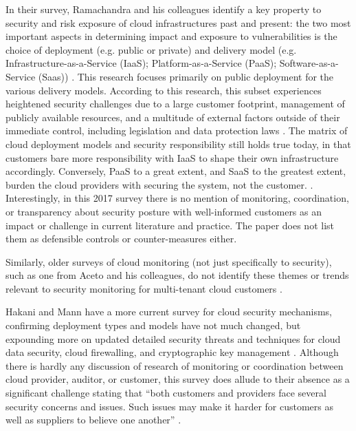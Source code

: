 \documentclass{jdf}
\begin{document}
In their survey, Ramachandra and his colleagues identify a key property to security and risk exposure of cloud infrastructures past and present: the two most important aspects in determining impact and exposure to vulnerabilities is the choice of deployment (e.g. public or private) and delivery model (e.g. Infrastructure-as-a-Service (IaaS); Platform-as-a-Service (PaaS); Software-as-a-Service (Saas)) \citeyear[p.~468]{ramachandra17}. This research focuses primarily on public deployment for the various delivery models. According to this research, this subset experiences heightened security challenges due to a large customer footprint, management of publicly available resources, and a multitude of external factors outside of their immediate control, including legislation and data protection laws \cite[p.468]{ramachandra17}. The matrix of cloud deployment models and security responsibility still holds true today, in that customers bare more responsibility with IaaS to shape their own infrastructure accordingly. Conversely, PaaS to a great extent, and SaaS to the greatest extent, burden the cloud providers with securing the system, not the customer. \cite[p.~469]{ramachandra17}. Interestingly, in this 2017 survey there is no mention of monitoring, coordination, or transparency about security posture with well-informed customers as an impact or challenge in current literature and practice. The paper does not list them as defensible controls or counter-measures either.

Similarly, older surveys of cloud monitoring (not just specifically to security), such as one from Aceto and his colleagues, do not identify these themes or trends relevant to security monitoring for multi-tenant cloud customers \citeyear{aceto13}.

Hakani and Mann have a more current survey for cloud security mechanisms, confirming deployment types and models have not much changed, but expounding more on updated detailed security threats and techniques for cloud data security, cloud firewalling, and cryptographic key management \citeyear{hakani22}. Although there is hardly any discussion of research of monitoring or coordination between cloud provider, auditor, or customer, this survey does allude to their absence as a significant challenge stating that ``both customers and providers face several security concerns and issues. Such issues may make it harder for customers as well as suppliers to believe one another'' \citeyear[p.~475]{hakani22}.
\end{document}
